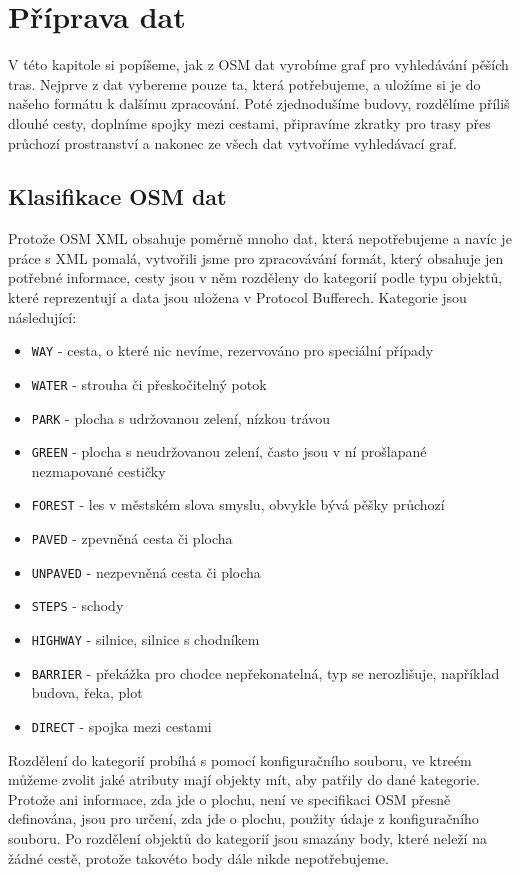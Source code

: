 \chapter{Příprava dat}
V této kapitole si popíšeme, jak z OSM dat vyrobíme graf pro vyhledávání pěších
tras. Nejprve z dat vybereme pouze ta, která potřebujeme, a uložíme si je do
našeho formátu k dalšímu zpracování. Poté zjednodušíme budovy, rozdělíme příliš
dlouhé cesty, doplníme spojky mezi cestami, připravíme zkratky pro trasy přes
průchozí prostranství a nakonec ze všech dat vytvoříme vyhledávací graf.

\section{Klasifikace OSM dat}
Protože OSM XML obsahuje poměrně mnoho dat, která nepotřebujeme a navíc je práce
s XML pomalá, vytvořili jsme pro zpracovávání formát, který obsahuje jen
potřebné informace, cesty jsou v něm rozděleny do kategorií podle typu objektů,
které reprezentují a data jsou uložena v Protocol Bufferech. Kategorie jsou
následující:
\begin{itemize}
	\item \verb|WAY| - cesta, o které nic nevíme, rezervováno pro speciální
	případy
	\item \verb|WATER| - strouha či přeskočitelný potok
	\item \verb|PARK| - plocha s udržovanou zelení, nízkou trávou
	\item \verb|GREEN| - plocha s neudržovanou zelení, často jsou v ní
	prošlapané nezmapované cestičky
	\item \verb|FOREST| - les v městském slova smyslu, obvykle bývá pěšky
	průchozí
	\item \verb|PAVED| - zpevněná cesta či plocha
	\item \verb|UNPAVED| - nezpevněná cesta či plocha
	\item \verb|STEPS| - schody
	\item \verb|HIGHWAY| - silnice, silnice s chodníkem
	\item \verb|BARRIER| - překážka pro chodce nepřekonatelná, typ se
	nerozlišuje, například budova, řeka, plot
	\item \verb|DIRECT| - spojka mezi cestami
\end{itemize}
Rozdělení do kategorií probíhá s pomocí konfiguračního souboru, ve ktreém můžeme
zvolit jaké atributy mají objekty mít, aby patřily do dané kategorie. Protože
ani informace, zda jde o plochu, není ve specifikaci OSM přesně definována, jsou
pro určení, zda jde o plochu, použity údaje z konfiguračního souboru. Po
rozdělení objektů do kategorií jsou smazány body, které neleží na žádné cestě,
protože takovéto body dále nikde nepotřebujeme.


